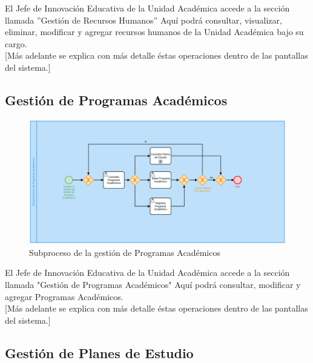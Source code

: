         El Jefe de Innovación Educativa de la Unidad Académica accede a la sección llamada ''Gestión de Recursos Humanos'' Aquí podrá consultar, visualizar, eliminar, modificar y agregar recursos humanos de la Unidad Académica bajo su cargo. \\

        [Más adelante se explica con más detalle éstas operaciones dentro de las pantallas del sistema.]\\
        \newpage
        \subsection{Gestión de Programas Académicos}

        \begin{figure}[!hbtp]
            \centering
            \hypertarget{BPMNGPA}{\includegraphics[width=\linewidth]{images/SP3/gestionPA.png}}
            \caption{Subproceso de la gestión de Programas Académicos}
            \label{BPMNGPA}
        \end{figure}

        El Jefe de Innovación Educativa de la Unidad Académica accede a la sección llamada "Gestión de Programas Académicos" Aquí podrá consultar, modificar y agregar Programas Académicos. \\

        [Más adelante se explica con más detalle éstas operaciones dentro de las pantallas del sistema.]\\
        \newpage
        \subsection{Gestión de Planes de Estudio}

